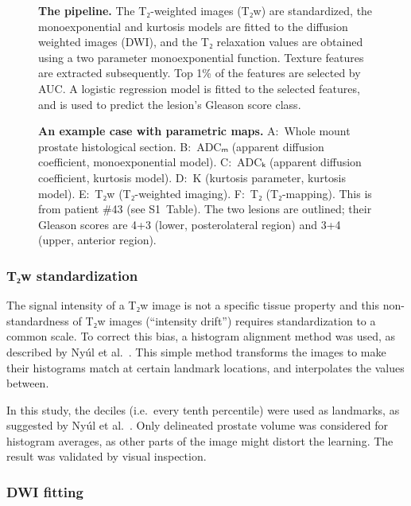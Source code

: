 \documentclass[10pt,letterpaper]{article}
\begin{document}
\begin{figure}[!ht]
    \centering
    \caption{{\bf The pipeline.}
    The T₂-weighted images (T₂w) are standardized, the monoexponential and
    kurtosis models are fitted to the diffusion weighted images (DWI), and the
    T₂ relaxation values are obtained using a two parameter monoexponential
    function. Texture features are extracted subsequently. Top 1\% of the
    features are selected by AUC\@. A logistic regression model is fitted to the
    selected features, and is used to predict the lesion's Gleason score
    class.}%
    \label{fig:pipeline}
\end{figure}

\begin{figure}[!ht]
    \centering
    \caption{{\bf An example case with parametric maps.}
    A:~Whole mount prostate histological section.
    B:~ADCₘ (apparent diffusion coefficient, monoexponential model).
    C:~ADCₖ (apparent diffusion coefficient, kurtosis model).
    D:~K (kurtosis parameter, kurtosis model).
    E:~T₂w (T₂-weighted imaging).
    F:~T₂ (T₂-mapping).
    This is from patient \#43 (see S1~Table). The two lesions are outlined;
    their Gleason scores are 4+3 (lower, posterolateral region) and 3+4 (upper,
    anterior region).}%
    \label{fig:pmap}
\end{figure}

\subsubsection{T₂w standardization}

The signal intensity of a T₂w image is not a specific tissue property and
this non-standardness of T₂w images (``intensity drift'') requires
standardization to a common scale. To correct this bias, a histogram alignment
method was used, as described by Nyúl et al.\ \cite{Nyul1999, Nyul2000}. This
simple method transforms the images to make their histograms match at certain
landmark locations, and interpolates the values between.

In this study, the deciles (i.e.\ every tenth percentile) were used as
landmarks, as suggested by Nyúl et al.\ \cite{Nyul1999}. Only delineated
prostate volume was considered for histogram averages, as other parts of the
image might distort the learning. The result was validated by visual inspection.

\subsubsection{DWI fitting}
\end{document}

